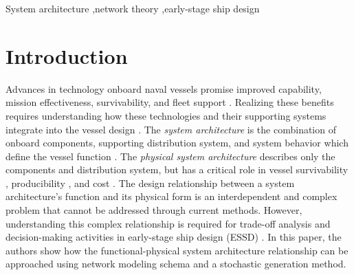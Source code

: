 \documentclass[preprint,12pt]{elsarticle}
\begin{document}
\begin{frontmatter}
\begin{abstract}
\end{abstract}

\begin{keyword}


System architecture \sep network theory \sep early-stage ship design

\end{keyword}

\end{frontmatter}


\section{Introduction} \label{sec:intro}

Advances in technology onboard naval vessels promise improved capability, mission effectiveness, survivability, and fleet support \citep{Piff2013,Doerry2014}. Realizing these benefits requires understanding how these technologies and their supporting systems integrate into the vessel design \citep{Kassel2010,Chalfant2015}. The \textit{system architecture} is the combination of onboard components, supporting distribution system, and system behavior which define the vessel function \citep{Jaakkola2011}. The \textit{physical system architecture} describes only the components and distribution system, but has a critical role in vessel survivability \citep{Doerry2004,Doerry2007,Kassel2010,Trapp2015}, producibility \citep{Keane2011,Keane2015}, and cost \citep{Miroyannis2006,Dobson2014}. The design relationship between a system architecture's function and its physical form is an interdependent and complex problem that cannot be addressed through current methods. However, understanding this complex relationship is required for trade-off analysis and decision-making activities in early-stage ship design (ESSD) \citep{Brown2015}. In this paper, the authors show how the functional-physical system architecture relationship can be approached using network modeling schema and a stochastic generation method.
\end{document}

